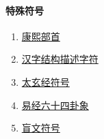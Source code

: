 \paragraph{特殊符号}
\begin{enumerate}
  \item \href{http://www.unicode.org/charts/PDF/U2F00.pdf}{康熙部首}
  \item \href{http://www.unicode.org/charts/PDF/U2FF0.pdf}{汉字结构描述字符}
  \item \href{http://www.unicode.org/charts/PDF/U1D300.pdf}{太玄经符号}
  \item \href{http://www.unicode.org/charts/PDF/U4DC0.pdf}{易经六十四卦象}
  \item \href{http://www.unicode.org/charts/PDF/U2800.pdf}{盲文符号}
\end{enumerate}
